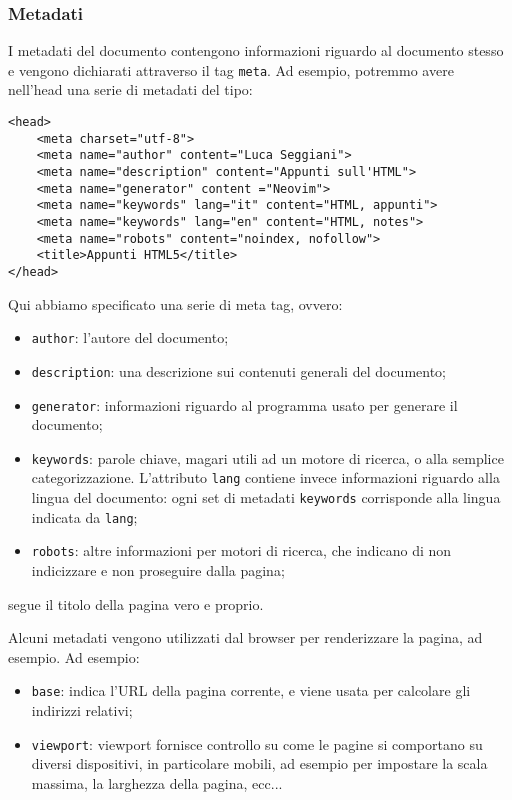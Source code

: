 \documentclass[a4paper,11pt]{article}
\begin{document}
\subsubsection{Metadati}
I metadati del documento contengono informazioni riguardo al documento stesso e vengono dichiarati attraverso il tag \lstinline|meta|.
Ad esempio, potremmo avere nell'head una serie di metadati del tipo:
\begin{lstlisting}	
<head>
	<meta charset="utf-8">
	<meta name="author" content="Luca Seggiani">
	<meta name="description" content="Appunti sull'HTML">
	<meta name="generator" content ="Neovim">
	<meta name="keywords" lang="it" content="HTML, appunti">
	<meta name="keywords" lang="en" content="HTML, notes">
	<meta name="robots" content="noindex, nofollow">
	<title>Appunti HTML5</title>
</head>
\end{lstlisting}

Qui abbiamo specificato una serie di meta tag, ovvero:
\begin{itemize}
	\item \lstinline|author|: l'autore del documento;
	\item \lstinline|description|: una descrizione sui contenuti generali del documento;
	\item \lstinline|generator|: informazioni riguardo al programma usato per generare il documento;
	\item \lstinline|keywords|: parole chiave, magari utili ad un motore di ricerca, o alla semplice categorizzazione. L'attributo \lstinline|lang| contiene invece informazioni riguardo alla lingua del documento: ogni set di metadati \lstinline|keywords| corrisponde alla lingua indicata da \lstinline|lang|;
	\item \lstinline|robots|: altre informazioni per motori di ricerca, che indicano di non indicizzare e non proseguire dalla pagina;
\end{itemize}
segue il titolo della pagina vero e proprio.

Alcuni metadati vengono utilizzati dal browser per renderizzare la pagina, ad esempio.
Ad esempio:
\begin{itemize}
	\item \lstinline|base|: indica l'URL della pagina corrente, e viene usata per calcolare gli indirizzi relativi;
	\item \lstinline|viewport|: viewport fornisce controllo su come le pagine si comportano su diversi dispositivi, in particolare mobili, ad esempio per impostare la scala massima, la larghezza della pagina, ecc...
\end{itemize}
\end{document}
